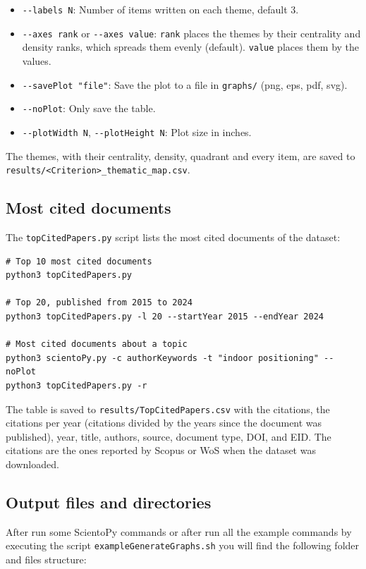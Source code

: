 \documentclass[10pt,letterpaper]{article}
\begin{document}
\begin{itemize}
\item \verb|--labels N|: Number of items written on each theme, default 3.
\item \verb|--axes rank| or \verb|--axes value|: \verb|rank| places the themes by their centrality and density ranks, which spreads them evenly (default). \verb|value| places them by the values.
\item \verb|--savePlot "file"|: Save the plot to a file in \verb|graphs/| (png, eps, pdf, svg).
\item \verb|--noPlot|: Only save the table.
\item \verb|--plotWidth N|, \verb|--plotHeight N|: Plot size in inches.
\end{itemize}

The themes, with their centrality, density, quadrant and every item, are saved to \verb|results/<Criterion>_thematic_map.csv|.

\subsection{Most cited documents}
\label{sec_most_cited}

The \verb|topCitedPapers.py| script lists the most cited documents of the dataset:

\begin{verbatim}
# Top 10 most cited documents
python3 topCitedPapers.py

# Top 20, published from 2015 to 2024
python3 topCitedPapers.py -l 20 --startYear 2015 --endYear 2024

# Most cited documents about a topic
python3 scientoPy.py -c authorKeywords -t "indoor positioning" --noPlot
python3 topCitedPapers.py -r
\end{verbatim}

The table is saved to \verb|results/TopCitedPapers.csv| with the citations, the citations per year (citations divided by the years since the document was published), year, title, authors, source, document type, DOI, and EID. The citations are the ones reported by Scopus or WoS when the dataset was downloaded.

\subsection{Output files and directories}

After run some ScientoPy commands or after run all the example commands by executing the script \verb|exampleGenerateGraphs.sh| you will find the following folder and files structure:
\end{document}
